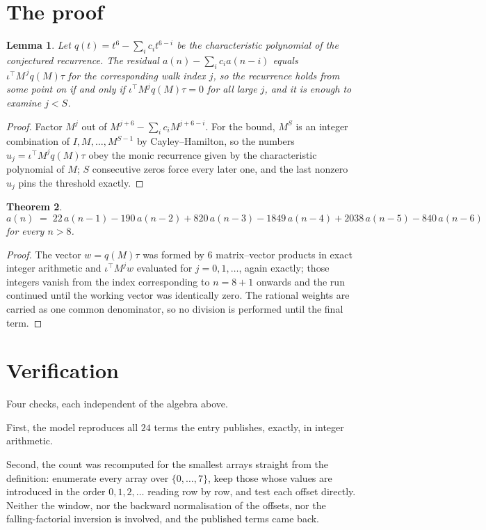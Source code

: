 \documentclass[11pt,a4paper]{article}
\theoremstyle{plain}
\newtheorem{theorem}{Theorem}
\newtheorem{lemma}[theorem]{Lemma}
\theoremstyle{definition}
\begin{document}
\section{The proof}

\begin{lemma}\label{lem:crit}
Let $q(t)=t^{6}-\sum_i c_it^{6-i}$ be the characteristic polynomial of the
conjectured recurrence. The residual $a(n)-\sum_ic_ia(n-i)$ equals
$\iota^{\!\top}M^{\,j}q(M)\tau$ for the corresponding walk index $j$, so the recurrence
holds from some point on if and only if $\iota^{\!\top}M^{j}q(M)\tau=0$ for all large $j$,
and it is enough to examine $j<S$.
\end{lemma}

\begin{proof}
Factor $M^{j}$ out of $M^{j+6}-\sum_ic_iM^{j+6-i}$. For the bound, $M^{S}$
is an integer combination of $I,M,\dots,M^{S-1}$ by Cayley--Hamilton, so the numbers
$u_j=\iota^{\!\top}M^{j}q(M)\tau$ obey the monic recurrence given by the characteristic
polynomial of $M$; $S$ consecutive zeros force every later one, and the last nonzero $u_j$
pins the threshold exactly.
\end{proof}

\begin{theorem}
\[
a(n)\;=\;22\,a(n-1) - 190\,a(n-2) + 820\,a(n-3) - 1849\,a(n-4) + 2038\,a(n-5) - 840\,a(n-6)
\]
for every $n>8$.
\end{theorem}

\begin{proof}
The vector $w=q(M)\tau$ was formed by $6$ matrix--vector products in exact integer
arithmetic and $\iota^{\!\top}M^{j}w$ evaluated for $j=0,1,\dots$, again exactly; those
integers vanish from the index corresponding to $n=8+1$ onwards and the run continued
until the working vector was identically zero. The rational weights are carried as one common
denominator, so no division is performed until the final term.
\end{proof}

\section{Verification}

Four checks, each independent of the algebra above.

First, the model reproduces all $24$ terms the entry publishes, exactly, in integer
arithmetic.

Second, the count was recomputed for the smallest arrays straight from the definition:
enumerate every array over $\{0,\dots,7\}$, keep those whose values are introduced in the
order $0,1,2,\dots$ reading row by row, and test each offset directly. Neither the window, nor
the backward normalisation of the offsets, nor the falling-factorial inversion is involved, and
the published terms came back.
\end{document}
